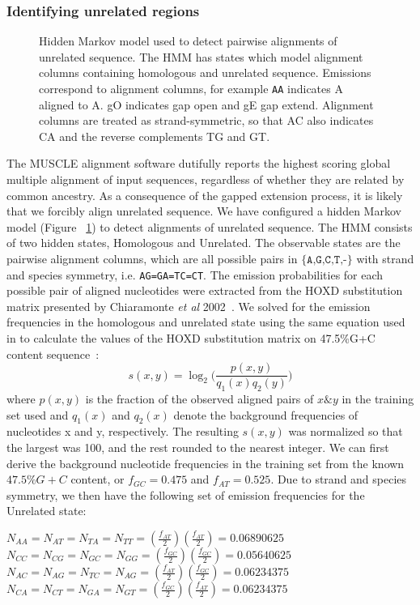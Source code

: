 \documentclass{ws-procs975x65}
\begin{document}
\subsubsection{Identifying unrelated regions}
\begin{figure}[t]
\centering {}
\caption{Hidden Markov model used to detect pairwise alignments of unrelated sequence. The HMM has states which model alignment columns containing homologous and unrelated sequence.  Emissions correspond to alignment columns, for example \texttt{AA} indicates A aligned to A.  gO indicates gap open and gE gap extend. Alignment columns are treated as strand-symmetric, so that AC also indicates CA and the reverse complements TG and GT.}
\label{fig-hmm}\vspace{-0.2cm}
\end{figure}
The MUSCLE alignment software dutifully reports the highest scoring global multiple alignment of input sequences, regardless of whether they are related by common ancestry. As a consequence of the gapped extension process, it is likely that we forcibly align unrelated sequence. We have configured a hidden Markov model (Figure ~\ref{fig-hmm}) to detect alignments of unrelated sequence. The HMM consists of two hidden states, Homologous and Unrelated. The observable states are the pairwise alignment columns, which are all possible pairs in $\texttt{{\{A,G,C,T,-\}}}$ with strand and species symmetry, i.e. \texttt{AG=GA=TC=CT}.  The emission probabilities for each possible pair of aligned nucleotides were extracted from the HOXD substitution matrix presented by Chiaramonte \textit{et al} 2002~\cite{hoxd}. We solved for the emission frequencies in the homologous and unrelated state using the same equation used in to calculate the values of the HOXD substitution matrix on 47.5\%G+C content sequence~\cite{hoxd}:
\begin{equation}
s(x,y)= \log_{2}{\Bigg(\frac{p(x,y)}{q_{1}(x)q_{2}(y)}\Bigg)}
\end{equation}
where $p(x,y)$ is the fraction of the observed aligned pairs of $x\&y$ in the training set used and $q_{1}(x)$ and $q_{2}(x)$ denote the background frequencies of nucleotides x and y, respectively. The resulting $s(x,y)$ was normalized so that the largest was 100, and the rest rounded to the nearest integer. We can first derive the background nucleotide frequencies in the training set from the known $47.5\%G+C$ content, or $f_{GC}=0.475$ and $f_{AT}=0.525$. Due to strand and species symmetry, we then have the following set of emission frequencies for the Unrelated state: \begin{center}$N_{AA}=N_{AT}=N_{TA}=N_{TT}=(\frac{f_{AT}}{2})(\frac{f_{AT}}{2}) = 0.06890625$ \\
$N_{CC}=N_{CG}=N_{GC}=N_{GG}=(\frac{f_{GC}}{2})(\frac{f_{GC}}{2}) = 0.05640625$ \\
$N_{AC}=N_{AG}=N_{TC}=N_{AG}=(\frac{f_{AT}}{2})(\frac{f_{GC}}{2}) = 0.06234375$ \\
$N_{CA}=N_{CT}=N_{GA}=N_{GT}=(\frac{f_{GC}}{2})(\frac{f_{AT}}{2}) = 0.06234375$ \\
\end{center}
\end{document}
